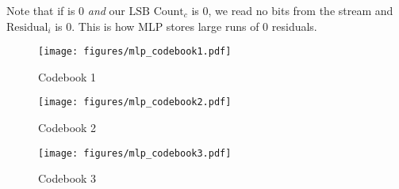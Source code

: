 Note that if  is 0 \textit{and} our $\text{LSB Count}_c$ is 0,
we read no bits from the stream and $\text{Residual}_i$ is 0.
This is how MLP stores large runs of 0 residuals.

\clearpage

\begin{figure}[h]
\label{mlp_codebooks}
\texttt{[image: figures/mlp\_codebook1.pdf]}
\caption{Codebook 1}
\texttt{[image: figures/mlp\_codebook2.pdf]}
\caption{Codebook 2}
\texttt{[image: figures/mlp\_codebook3.pdf]}
\caption{Codebook 3}
\end{figure}


